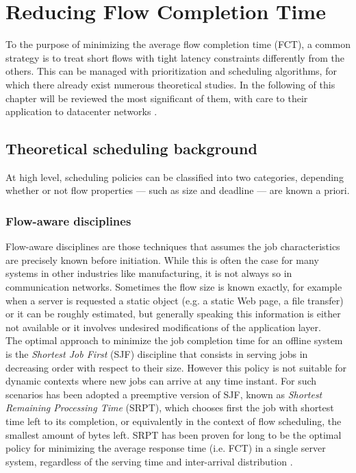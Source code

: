 \chapter{Reducing Flow Completion Time}
\label{ch:theoretical-scheduling-bg}
To the purpose of minimizing the average flow completion time (FCT), a common strategy is to treat short flows with tight latency constraints differently from the others. This can be managed with prioritization and scheduling algorithms, for which there already exist numerous theoretical studies. In the following of this chapter will be reviewed the most significant of them, with care to their application to datacenter networks \cite{dpp, 188942, pFabric, pias, one-more-queue, pdq}. 

\section{Theoretical scheduling background}
At high level, scheduling policies can be classified into two categories, depending whether or not flow properties --- such as size and deadline --- are known a priori.

\subsection{Flow-aware disciplines}
Flow-aware disciplines are those techniques that assumes the job characteristics are precisely known before initiation. While this is often the case for many systems in other industries like manufacturing, it is not always so in communication networks. Sometimes the flow size is known exactly, for example when a server is requested a static object (e.g. a static Web page, a file transfer) or it can be roughly estimated, but generally speaking this information is either not available or it involves undesired modifications of the application layer. \\
The optimal approach to minimize the job completion time for an offline system is the \emph{Shortest Job First} (SJF) discipline that consists in serving jobs in decreasing order with respect to their size. However this policy is not suitable for dynamic contexts where new jobs can arrive at any time instant. For such scenarios has been adopted a preemptive version of SJF, known as \emph{Shortest Remaining Processing Time} (SRPT), which chooses first the job with shortest time left to its completion, or equivalently in the context of flow scheduling, the smallest amount of bytes left. SRPT has been proven for long to be the optimal policy for minimizing the average response time (i.e. FCT) in a single server system, regardless of the serving time and inter-arrival distribution \cite{schrage_1968}. 

